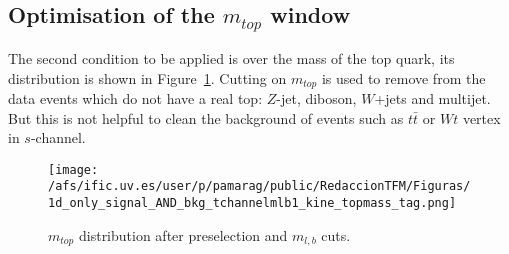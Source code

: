 \subsection{Optimisation of the \boldmath$m_{top}$ window}
The second condition to be applied is over the mass of the top quark, its distribution is shown in Figure~\ref{Fig:topmassDistribution}. Cutting on $m_{top}$ is used to remove from the data events which do not have a real top: $Z$-jet, diboson, $W$+jets and multijet. But this is not helpful to clean the background of events such as $t\bar{t}$ or $Wt$ vertex in $s$-channel.

\begin{figure}[h]
\centering
\texttt{[image: /afs/ific.uv.es/user/p/pamarag/public/RedaccionTFM/Figuras/1d\_only\_signal\_AND\_bkg\_tchannelmlb1\_kine\_topmass\_tag.png]}
\caption{$m_{top}$ distribution after preselection and $m_{l,b}$ cuts.}
\label{Fig:topmassDistribution}
\end{figure}


